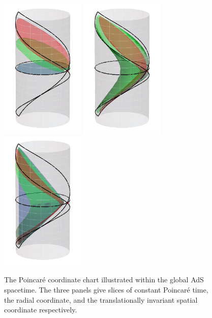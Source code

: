 \documentclass[12pt,openany]{book}
\begin{document}
\begin{figure}[htbp]
\begin{center}
\includegraphics[width=4cm]{figures/plotct}
\hspace{2cm}
\includegraphics[width=4cm]{figures/plotcz}
\hspace{2cm}
\includegraphics[width=4cm]{figures/plotcx}
\caption{The Poincar\'e coordinate chart illustrated within the global AdS spacetime. The three panels give slices of constant Poincar\'e time,  the radial coordinate, and the translationally invariant spatial coordinate respectively. }
\label{f:poincarecoords}
\end{center}
\end{figure}
%
\end{document}
